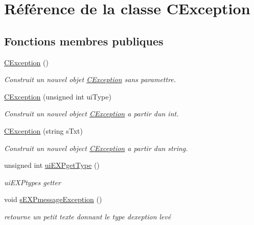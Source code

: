 \hypertarget{classCException}{}\section{Référence de la classe C\+Exception}
\label{classCException}
\subsection*{Fonctions membres publiques}
\begin{DoxyCompactItemize}
\item 
\mbox{\label{classCException_a193ebfae477160a82d6e44299af4ed10}} 
\hyperlink{classCException_a193ebfae477160a82d6e44299af4ed10}{C\+Exception} ()
\begin{DoxyCompactList}\small\item\em Construit un nouvel objet \hyperlink{classCException}{C\+Exception} sans paramettre. \end{DoxyCompactList}\item 
\hyperlink{classCException_a84f4e7fa075fdd466c5b203048205a6b}{C\+Exception} (unsigned int ui\+Type)
\begin{DoxyCompactList}\small\item\em Construit un nouvel object \hyperlink{classCException}{C\+Exception} a partir d\textquotesingle{}un int. \end{DoxyCompactList}\item 
\hyperlink{classCException_aab8f2fdcdc5e4390e66a32c8706b9df8}{C\+Exception} (string s\+Txt)
\begin{DoxyCompactList}\small\item\em Construit un nouvel object \hyperlink{classCException}{C\+Exception} a partir d\textquotesingle{}un string. \end{DoxyCompactList}\item 
unsigned int \hyperlink{classCException_a916fc87bccf954a5e112967e4f90bb98}{ui\+E\+X\+Pget\+Type} ()
\begin{DoxyCompactList}\small\item\em ui\+E\+X\+Ptype\textquotesingle{}s getter \end{DoxyCompactList}\item 
void \hyperlink{classCException_a7b5dd75546b7c7bf13206633c8237336}{s\+E\+X\+Pmessage\+Exception} ()
\begin{DoxyCompactList}\small\item\em retourne un petit texte donnant le type d\textquotesingle{}exeption levé \end{DoxyCompactList}\end{DoxyCompactItemize}



